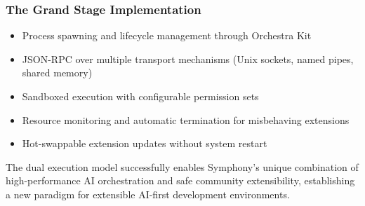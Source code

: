 \subsubsection*{The Grand Stage Implementation}
\begin{itemize}
\item Process spawning and lifecycle management through Orchestra Kit
\item JSON-RPC over multiple transport mechanisms (Unix sockets, named pipes, shared memory)
\item Sandboxed execution with configurable permission sets
\item Resource monitoring and automatic termination for misbehaving extensions
\item Hot-swappable extension updates without system restart
\end{itemize}

The dual execution model successfully enables Symphony's unique combination of high-performance AI orchestration and safe community extensibility, establishing a new paradigm for extensible AI-first development environments.
